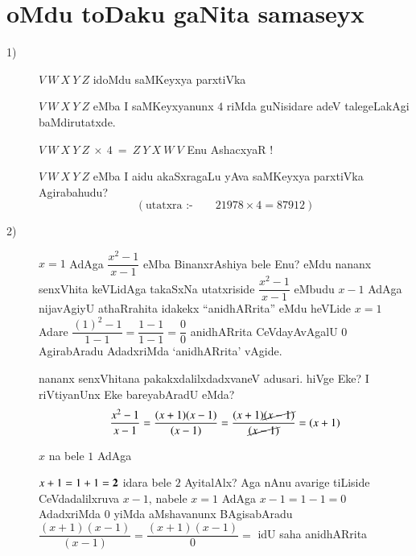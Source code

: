 \chapter{oMdu toDaku gaNita samaseyx}

\begin{description}
\item[{\rm 1)}] $V ~W ~X ~Y ~Z$ idoMdu saMKeyxya parxtiVka

  $V ~W ~X ~Y ~Z$ eMba I saMKeyxyanunx $4$ riMda guNisidare adeV talegeLakAgi baMdirutatxde.

  $V ~W ~X ~Y ~Z ~ \times ~4 ~= ~Z ~Y~X~W~V$ Enu AshacxyaR !

  $V ~W ~X ~Y ~Z$ eMba I aidu akaSxragaLu yAva saMKeyxya parxtiVka Agirabahudu?
  $$
(\text{utatxra :-}\qquad  21978 \times 4 = 87912)
  $$
  
\item[{\rm 2)}] $x=1$ AdAga $\dfrac{x^2-1}{x-1}$ eMba BinanxrAshiya bele Enu? eMdu nananx senxVhita keVLidAga takaSxNa utatxriside $\dfrac{x^2-1}{x-1}$ eMbudu $x-1$ AdAga nijavAgiyU athaRrahita idakekx ``anidhARrita'' eMdu heVLide $x=1$ Adare $\dfrac{(1)^2 -1}{1-1} = \dfrac{1-1}{1-1} = \dfrac{0}{0}$ anidhARrita CeVdayAvAgalU $0$ AgirabAradu AdadxriMda `anidhARrita' vAgide.

  nananx senxVhitana pakakxdalilxdadxvaneV adusari. hiVge Eke? I riVtiyanUnx Eke bareyabAradU eMda?
  $$
  \frac{x^2-1}{x-1} = \frac{(x+1)(x-1)}{(x-1)} = \frac{(x+1)\cancel{(x-1)}}{\cancel{(x-1)}} = (x+1)
  $$

  $x$ na bele $1$ AdAga
  
  $x+1 =1+1 ={\bf 2}$ idara bele $2$ AyitalAlx? Aga nAnu avarige tiLiside CeVdadalilxruva $x-1$, nabele $x=1$ AdAga $x-1=1-1=0$ AdadxriMda $0$ yiMda aMshavanunx BAgisabAradu $\dfrac{(x+1)(x-1)}{(x-1)} = \dfrac{(x+1)(x-1)}{0} =$ idU saha anidhARrita
\end{description}
